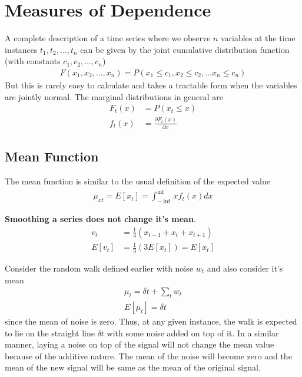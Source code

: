 \documentclass[../../time_series_notes.tex]{subfiles}
\begin{document}
\section{Measures of Dependence}
A complete description of a time series where we observe $n$ variables at the time instances $t_{1}, t_{2}, \ldots, t_{n}$ can be given by the joint cumulative distribution function (with constants $c_{1}, c_{2}, \ldots, c_{n}$)
\begin{align*}
    F(x_{1}, x_{2}, \ldots, x_{n}) = P(x_{1} \leq c_{1}, x_{2} \leq c_{2}, \ldots x_{n} \leq c_{n})
\end{align*}
But this is rarely easy to calculate and takes a tractable form when the variables are jointly normal. The marginal distributions in general are
\begin{align*}
    F_{t}(x) &= P(x_{t} \leq x)\\
    f_{t}(x) &= \frac{\partial F_{t}(x)}{\partial x}
\end{align*}


\subsection{Mean Function} \label{mean_fun}
The mean function is similar to the usual definition of the expected value
\begin{align*}
    \mu_{xt} = E[x_{t}] =  \int_{-\inf}^{\inf} x f_{t}(x) dx
\end{align*}

\textbf{Smoothing a series does not change it's mean}.
\begin{align*}
    v_{t} &= \frac{1}{3}(x_{t-1} + x_{t} + x_{t+1})\\
    E[v_{t}] &= \frac{1}{3}(3E[x_{t}]) = E[x_{t}]
\end{align*}

Consider the random walk defined earlier with noise $w_{t}$ and also consider it's mean
\begin{align*}
    \mu_{t} = \delta t + \sum_{t} w_{t}\\
    E[\mu_{t}] = \delta t
\end{align*}
since the mean of noise is zero. Thus, at any given instance, the walk is expected to lie on the straight line $\delta t$ with some noise added on top of it.\newline
In a similar manner, laying a noise on top of the signal will not change the mean value because of the additive nature. The mean of the noise will become zero and the mean of the new signal will be same as the mean of the original signal.
\end{document}
